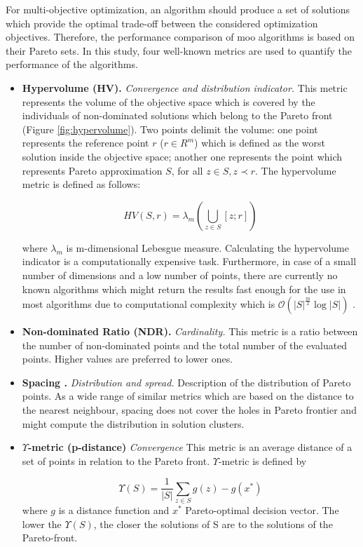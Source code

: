             For multi-objective optimization, an algorithm should produce a set of solutions which provide the optimal trade-off between the considered optimization objectives. Therefore, the performance comparison of \gls{moo} algorithms is based on their Pareto sets. In this study, four well-known metrics are used to quantify the performance of the algorithms.
            \begin{itemize}
                \item \textbf{Hypervolume (HV).}\cite{ZitzlerDT00} \textit{Convergence and distribution indicator.}
                This metric represents the volume of the objective space which is covered by the individuals of non-dominated solutions which belong to the Pareto front (Figure \ref{fig:hypervolume}). Two points delimit the volume: one point represents the reference point $r$ ($r \in R^m$) which is defined as the worst solution inside the objective space; another one represents the point which represents Pareto approximation $S$, for all $z \in S, z \prec r$. The hypervolume metric is defined as follows:

                    \[HV(S,r) = \lambda_m(\bigcup\limits_{z \in S} [z;r])\]

                where $\lambda_m$ is m-dimensional Lebesgue measure.    
                Calculating the hypervolume indicator is a computationally expensive task. Furthermore, in case of a small number of dimensions and a low number of points, there are currently no known algorithms which might return the results fast enough for the use in most algorithms due to computational complexity which is 
                $\mathcal{O}(|S|^{\frac{m}{2}}\log{|S|}) $ \cite{BeumeFLPV09}.
                \item \textbf{Non-dominated Ratio (NDR).} \textit{Cardinality.} This metric is a ratio between the number of non-dominated points and the total number of the evaluated points.  Higher values are preferred to lower ones.
                \item \textbf{Spacing \cite{Schott1995FaultTD}.} \textit{Distribution and spread.} Description of the distribution of Pareto points. As a wide range of similar metrics which are based on the distance to the nearest neighbour, spacing does not cover the holes in Pareto frontier and might compute the distribution in solution clusters.
                \item \textbf{$\Upsilon$-metric (p-distance)}\cite{Martens13} \textit{Convergence} This metric is an average distance of a set of points in relation to the Pareto front. $\Upsilon$-metric is defined by

                    \[\Upsilon(S) = \frac{1}{|S|}\sum_{z\in S}g(z)-g(x^*)\]
                where $g$ is a distance function and $x^*$ Pareto-optimal decision vector.
                The lower the $\Upsilon (S)$, the closer the solutions of S are to the solutions of the Pareto-front. 
                
            \end{itemize}

